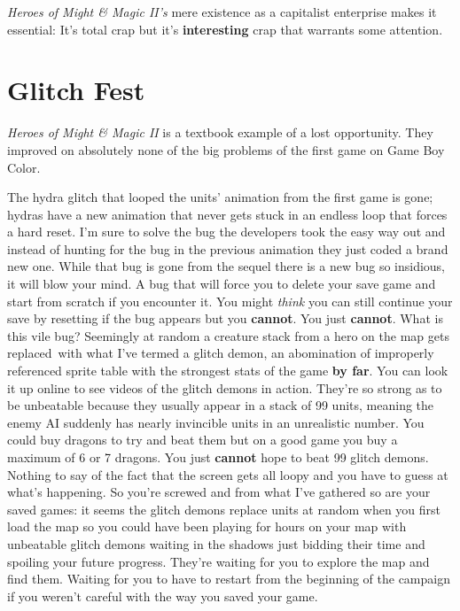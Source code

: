 \documentclass{book}
\begin{document}
\emph{Heroes of Might \& Magic II’s} mere existence as a capitalist enterprise makes it essential: It’s total crap but it’s \textbf{interesting} crap that warrants some attention.

\FloatBarrier\needspace{10mm}\section*{Glitch Fest}\nopagebreak[4]

\emph{Heroes of Might \& Magic II} is a textbook example of a lost opportunity. They improved on absolutely none of the big problems of the first game on Game Boy Color.

The hydra glitch that looped the units’ animation from the first game is gone; hydras have a new animation that never gets stuck in an endless loop that forces a hard reset. I’m sure to solve the bug the developers took the easy way out and instead of hunting for the bug in the previous animation they just coded a brand new one. While that bug is gone from the sequel there is a new bug so insidious, it will blow your mind. A bug that will force you to delete your save game and start from scratch if you encounter it. You might \emph{think} you can still continue your save by resetting if the bug appears but you \textbf{cannot}. You just \textbf{cannot}. What is this vile bug? Seemingly at random a creature stack from a hero on the map gets replaced~with what I’ve termed a glitch demon, an abomination of improperly referenced sprite table with the strongest stats of the game \textbf{by far}. You can look it up online to see videos of the glitch demons in action. They’re so strong as to be unbeatable because they usually appear in a stack of 99 units, meaning the enemy AI suddenly has nearly invincible units in an unrealistic number. You could buy dragons to try and beat them but on a good game you buy a maximum of 6 or 7 dragons. You just \textbf{cannot} hope to beat 99 glitch demons. Nothing to say of the fact that the screen gets all loopy and you have to guess at what’s happening. So you’re screwed and from what I’ve gathered so are your saved games: it seems the glitch demons replace units at random when you first load the map so you could have been playing for hours on your map with unbeatable glitch demons waiting in the shadows just bidding their time and spoiling your future progress. They’re waiting for you to explore the map and find them. Waiting for you to have to restart from the beginning of the campaign if you weren’t careful with the way you saved your game.
\end{document}

